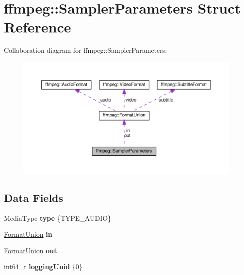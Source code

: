 \hypertarget{structffmpeg_1_1SamplerParameters}{}\section{ffmpeg\+:\+:Sampler\+Parameters Struct Reference}
\label{structffmpeg_1_1SamplerParameters}


Collaboration diagram for ffmpeg\+:\+:Sampler\+Parameters\+:
\nopagebreak
\begin{figure}[H]
\begin{center}
\leavevmode
\includegraphics[width=350pt]{structffmpeg_1_1SamplerParameters__coll__graph}
\end{center}
\end{figure}
\subsection*{Data Fields}
\begin{DoxyCompactItemize}
\item 
\mbox{\label{structffmpeg_1_1SamplerParameters_ab8e28cdf6667a27f0a0ce3a6ddd895fc}} 
Media\+Type {\bfseries type} \{T\+Y\+P\+E\+\_\+\+A\+U\+D\+IO\}
\item 
\mbox{\label{structffmpeg_1_1SamplerParameters_a188cd1b7bfdb0133a50859521c225544}} 
\hyperlink{unionffmpeg_1_1FormatUnion}{Format\+Union} {\bfseries in}
\item 
\mbox{\label{structffmpeg_1_1SamplerParameters_afdcb060adc469e7a7b49df5945adc052}} 
\hyperlink{unionffmpeg_1_1FormatUnion}{Format\+Union} {\bfseries out}
\item 
\mbox{\label{structffmpeg_1_1SamplerParameters_a56c871e5a93cc79665a4114ff49a1dc4}} 
int64\+\_\+t {\bfseries logging\+Uuid} \{0\}
\end{DoxyCompactItemize}


